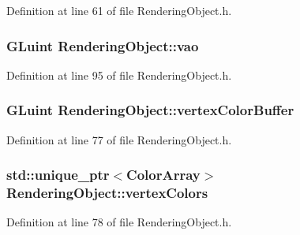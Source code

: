 Definition at line 61 of file Rendering\+Object.\+h.

\hypertarget{class_rendering_object_a96dd05670a977a949514a2c490c1c867}{}
\subsubsection[{vao}]{\setlength{\rightskip}{0pt plus 5cm}G\+Luint Rendering\+Object\+::vao\hspace{0.3cm}{\ttfamily [protected]}}\label{class_rendering_object_a96dd05670a977a949514a2c490c1c867}


Definition at line 95 of file Rendering\+Object.\+h.

\hypertarget{class_rendering_object_aeb014a4ef24e2fc4665a769241660cad}{}
\subsubsection[{vertex\+Color\+Buffer}]{\setlength{\rightskip}{0pt plus 5cm}G\+Luint Rendering\+Object\+::vertex\+Color\+Buffer\hspace{0.3cm}{\ttfamily [protected]}}\label{class_rendering_object_aeb014a4ef24e2fc4665a769241660cad}


Definition at line 77 of file Rendering\+Object.\+h.

\hypertarget{class_rendering_object_a65fc52e665791ce55e43106b603e917a}{}
\subsubsection[{vertex\+Colors}]{\setlength{\rightskip}{0pt plus 5cm}std\+::unique\+\_\+ptr$<${\bf Color\+Array}$>$ Rendering\+Object\+::vertex\+Colors\hspace{0.3cm}{\ttfamily [protected]}}\label{class_rendering_object_a65fc52e665791ce55e43106b603e917a}


Definition at line 78 of file Rendering\+Object.\+h.

\hypertarget{class_rendering_object_a6740a0a0e6bd4d841c9c211f2a31cca3}{}

